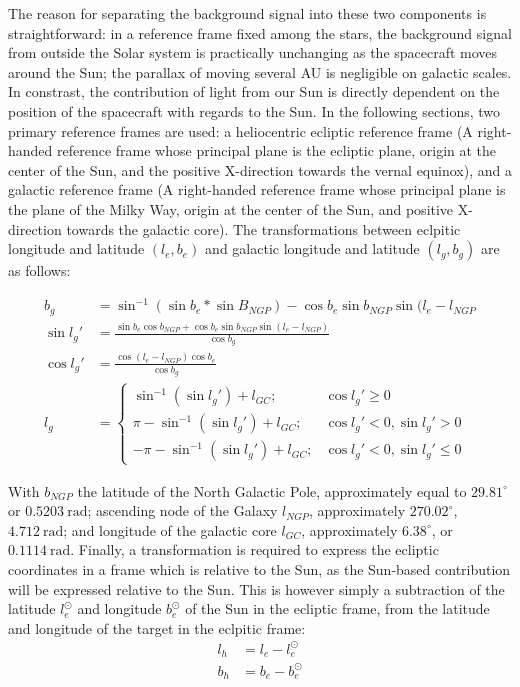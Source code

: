 The reason for separating the background signal into these two components is straightforward: in a reference frame fixed among the stars, the background signal from outside the Solar system is practically unchanging as the spacecraft moves around the Sun; the parallax of moving several AU is negligible on galactic scales. In constrast, the contribution of light from our Sun is directly dependent on the position of the spacecraft with regards to the Sun. In the following sections, two primary reference frames are used: a heliocentric ecliptic reference frame (A right-handed reference frame whose principal plane is the ecliptic plane, origin at the center of the Sun, and the positive X-direction towards the vernal equinox), and a galactic reference frame (A right-handed reference frame whose principal plane is the plane of the Milky Way, origin at the center of the Sun, and positive X-direction towards the galactic core). The transformations between eclpitic longitude and latitude $(l_e, b_e)$ and galactic longitude and latitude $(l_g, b_g)$ are as follows:

\begin{align}
 b_g &= \sin ^{-1} (\sin b_e * \sin B_{NGP}) - \cos b_e \sin b_{NGP} \sin (l_e - l_{NGP} \\
 \sin l_g' &= \frac{\sin b_e \cos b_{NGP} + \cos b_e \sin b_{NGP} \sin (l_e - l_{NGP})}{\cos b_g} \\
 \cos l_g' &= \frac{\cos (l_e - l_{NGP}) \cos b_e}{\cos b_g} \\
 l_g &= \begin{cases}
        \sin ^{-1} (\sin l_g') + l_{GC}; & \cos l_g' \geq 0 \\
        \pi - \sin^{-1} (\sin l_g') + l_{GC}; & \cos l_g' < 0, \sin l_g' > 0 \\
        - \pi - \sin^{-1} (\sin l_g') + l_{GC}; & \cos l_g' < 0, \sin l_g' \leq 0
       \end{cases}
\end{align}

With $b_{NGP}$ the latitude of the North Galactic Pole, approximately equal to $29.81^\circ$ or $0.5203 ~\mathrm{rad}$; ascending node of the Galaxy $l_{NGP}$, approximately $270.02^\circ$, $4.712 ~\mathrm{rad}$; and longitude of the galactic core $l_{GC}$, approximately $6.38^\circ$, or $0.1114 ~\mathrm{rad}$. Finally, a transformation is required to express the ecliptic coordinates in a frame which is relative to the Sun, as the Sun-based contribution will be expressed relative to the Sun. This is however simply a subtraction of the latitude $l_e^\odot$ and longitude $b_e^\odot$ of the Sun in the ecliptic frame, from the latitude and longitude of the target in the eclpitic frame:
\begin{align}
 l_h &= l_e - l_e^\odot \\
 b_h &= b_e - b_e^\odot
\end{align}

